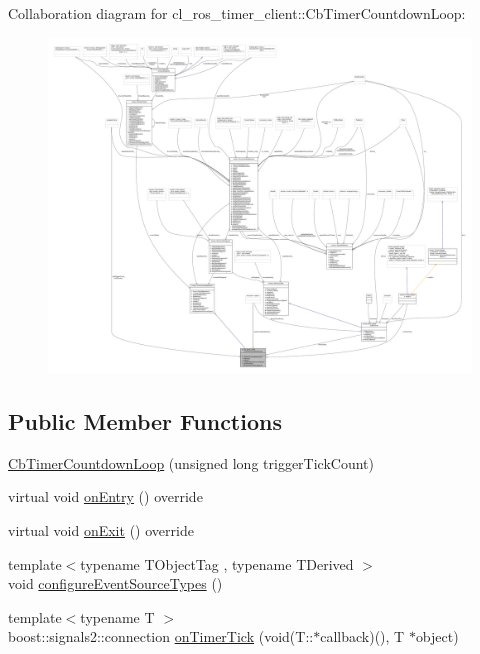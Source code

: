 Collaboration diagram for cl\+\_\+ros\+\_\+timer\+\_\+client\+:\+:Cb\+Timer\+Countdown\+Loop\+:
\nopagebreak
\begin{figure}[H]
\begin{center}
\leavevmode
\includegraphics[width=350pt]{classcl__ros__timer__client_1_1CbTimerCountdownLoop__coll__graph}
\end{center}
\end{figure}
\subsection*{Public Member Functions}
\begin{DoxyCompactItemize}
\item 
\hyperlink{classcl__ros__timer__client_1_1CbTimerCountdownLoop_a70d0216749626c3bf1bc72d7dbed5d3b}{Cb\+Timer\+Countdown\+Loop} (unsigned long trigger\+Tick\+Count)
\item 
virtual void \hyperlink{classcl__ros__timer__client_1_1CbTimerCountdownLoop_af89be9be179bdb8814f852905ca20b95}{on\+Entry} () override
\item 
virtual void \hyperlink{classcl__ros__timer__client_1_1CbTimerCountdownLoop_a6f1c3ac1cf14f39950db4097d879205c}{on\+Exit} () override
\item 
{\footnotesize template$<$typename T\+Object\+Tag , typename T\+Derived $>$ }\\void \hyperlink{classcl__ros__timer__client_1_1CbTimerCountdownLoop_a21caa4e4bc7de1f3059c8743abcf43a8}{configure\+Event\+Source\+Types} ()
\item 
{\footnotesize template$<$typename T $>$ }\\boost\+::signals2\+::connection \hyperlink{classcl__ros__timer__client_1_1CbTimerCountdownLoop_a3e836923ac8c9988988590adfe89924b}{on\+Timer\+Tick} (void(T\+::$\ast$callback)(), T $\ast$object)
\end{DoxyCompactItemize}
